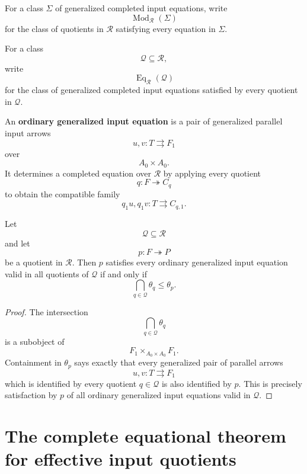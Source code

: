 \begin{definition}
\label{def:reiterman-models-equations}
For a class \(\Sigma\) of generalized completed input equations, write
\[
\operatorname{Mod}_{\mathcal R}(\Sigma)
\]
for the class of quotients in \(\mathcal R\) satisfying every equation in
\(\Sigma\).

For a class
\[
\mathcal Q\subseteq\mathcal R,
\]
write
\[
\operatorname{Eq}_{\mathcal R}(\mathcal Q)
\]
for the class of generalized completed input equations satisfied by every
quotient in \(\mathcal Q\).
\end{definition}

\begin{definition}
\label{def:reiterman-ordinary-generalized-input-equation}
An \textbf{ordinary generalized input equation} is a pair of generalized
parallel input arrows
\[
u,v:T\rightrightarrows F_1
\]
over
\[
A_0\times A_0.
\]
It determines a completed equation over \(\mathcal R\) by applying every
quotient
\[
q:F\twoheadrightarrow C_q
\]
to obtain the compatible family
\[
q_1u,q_1v:T\rightrightarrows C_{q,1}.
\]
\end{definition}

\begin{lemma}
\label{lem:reiterman-ordinary-equations-detect-containment}
Let
\[
\mathcal Q\subseteq\mathcal R
\]
and let
\[
p:F\twoheadrightarrow P
\]
be a quotient in \(\mathcal R\). Then \(p\) satisfies every ordinary
generalized input equation valid in all quotients of \(\mathcal Q\) if and
only if
\[
\bigcap_{q\in\mathcal Q}\theta_q
\leq
\theta_p.
\]
\end{lemma}

\begin{proof}
The intersection
\[
\bigcap_{q\in\mathcal Q}\theta_q
\]
is a subobject of
\[
F_1\times_{A_0\times A_0}F_1.
\]
Containment in \(\theta_p\) says exactly that every generalized pair of
parallel arrows
\[
u,v:T\rightrightarrows F_1
\]
which is identified by every quotient \(q\in\mathcal Q\) is also identified
by \(p\). This is precisely satisfaction by \(p\) of all ordinary generalized
input equations valid in \(\mathcal Q\).
\end{proof}

\section{The complete equational theorem for effective input quotients}
\label{sec:reiterman-complete-equational-theorem}

